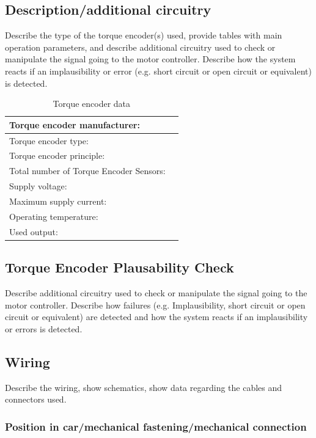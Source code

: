 \subsection{Description/additional circuitry}
Describe the type of the torque encoder(s) used, provide tables with main operation parameters, and describe additional circuitry used to check or manipulate the signal going to the motor controller. Describe how the system reacts if an implausibility or error (e.g. short circuit or open circuit or equivalent) is detected.

\begin{table}[H]
	\centering
	\caption{Torque encoder data}
	\begin{tabularx}{\textwidth}{|X|X|}
		\hline
		Torque encoder manufacturer: &  \\[\TableSize]\hline
		Torque encoder type: &  \\[\TableSize]\hline
		Torque encoder principle: &  \\[\TableSize]\hline
		Total number of Torque Encoder Sensors: &  \\[\TableSize]\hline
		Supply voltage: &  \\[\TableSize]\hline
		Maximum supply current: &  \\[\TableSize]\hline
		Operating temperature: &  \\[\TableSize]\hline
		Used output: &  \\[\TableSize]\hline
	\end{tabularx}%
	\label{tab:encoder-general}%
\end{table}%

\subsection{Torque Encoder Plausability Check}
Describe additional circuitry used to check or manipulate the signal going to the motor controller. Describe how failures (e.g. Implausibility, short circuit or open circuit or equivalent) are detected and how the system reacts if an implausibility or errors is detected.

\subsection{Wiring}
Describe the wiring, show schematics, show data regarding the cables and connectors used.

\subsubsection{Position in car/mechanical fastening/mechanical connection}

